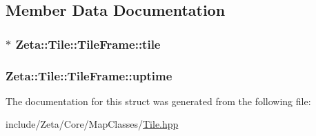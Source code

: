 \subsection{Member Data Documentation}
\hypertarget{structZeta_1_1Tile_1_1TileFrame_a1abbf5d54b4c227d1d3c72595987e814}{
\subsubsection[{tile}]{$\ast$ Zeta\+::\+Tile\+::\+Tile\+Frame\+::tile}}\label{structZeta_1_1Tile_1_1TileFrame_a1abbf5d54b4c227d1d3c72595987e814}
\hypertarget{structZeta_1_1Tile_1_1TileFrame_a8238c284c81423ea18c6b40d46522704}{
\subsubsection[{uptime}]{ Zeta\+::\+Tile\+::\+Tile\+Frame\+::uptime}}\label{structZeta_1_1Tile_1_1TileFrame_a8238c284c81423ea18c6b40d46522704}


The documentation for this struct was generated from the following file\+:\begin{DoxyCompactItemize}
\item 
include/\+Zeta/\+Core/\+Map\+Classes/\hyperlink{Tile_8hpp}{Tile.\+hpp}\end{DoxyCompactItemize}
